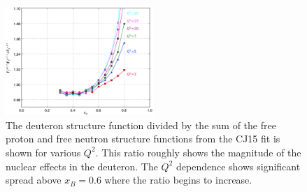 \documentclass[oneside]{article}
\begin{document}
\begin{figure}[H]
  \centering
      	  \includegraphics[width=0.5\textwidth]{plots/dpn_allCJ.png}
 	 \caption[Deuteron structure function from CJ15]{The deuteron structure function divided by the sum of the free proton and free neutron structure functions from the CJ15 fit is shown for various $Q^2$. This ratio roughly shows the magnitude of the nuclear effects in the deuteron. The $Q^2$ dependence shows significant spread above $x_B=0.6$ where the ratio begins to increase.}
  \label{fig:dpn_cj}
 \end{figure} 
 
\end{document}
